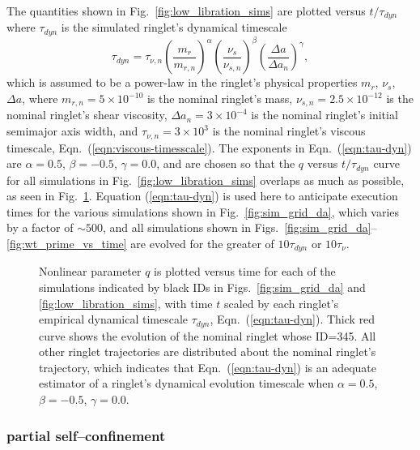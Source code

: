 \documentclass[preprint]{aastex62}
\begin{document}
The quantities shown in Fig.\ \ref{fig:low_libration_sims} are plotted versus 
$t/\tau_{dyn}$ where $\tau_{dyn}$ is the simulated ringlet's
dynamical timescale
\begin{equation}
    \label{eqn:tau-dyn}
    \tau_{dyn} = \tau_{\nu, n}\left(\frac{m_r}{m_{r,n}}\right)^\alpha
        \left(\frac{\nu_s}{\nu_{s,n}}\right)^\beta 
        \left(\frac{\Delta a}{\Delta a_{n}}\right)^\gamma,
\end{equation}
which is assumed to be a power-law in the ringlet's physical properties
$m_r$, $\nu_s$, $\Delta a$, where 
$m_{r,n}=5\times10^{-10}$ is the nominal ringlet's mass, 
$\nu_{s,n}=2.5\times10^{-12}$ is the nominal ringlet's shear viscosity, 
$\Delta a_{n}=3\times10^{-4}$ is the nominal ringlet's initial semimajor axis width,
and $\tau_{\nu, n} = 3\times10^3$ is the nominal ringlet's viscous timescale, 
Eqn.\ (\ref{eqn:viscous-timesscale}).
The exponents in Eqn.\ (\ref{eqn:tau-dyn}) are $\alpha=0.5$, $\beta=-0.5$, $\gamma=0.0$,
and are chosen so that the $q$ versus $t/\tau_{dyn}$ curve for all simulations
in Fig.\ \ref{fig:low_libration_sims} overlaps as much as possible, as
seen in Fig.\ \ref{fig:q_vs_ID}. Equation (\ref{eqn:tau-dyn}) is used here to anticipate
execution times for the various simulations shown in Fig.\ \ref{fig:sim_grid_da}, 
which varies by a factor of $\sim500$, and all simulations shown in 
Figs.\ \ref{fig:sim_grid_da}--\ref{fig:wt_prime_vs_time} are evolved for the greater of $10\tau_{dyn}$ or $10\tau_\nu$.
\begin{figure}
    \caption{
        \label{fig:q_vs_ID}
        Nonlinear parameter $q$ is plotted versus time for each of the
        simulations indicated by black IDs in Figs.\ \ref{fig:sim_grid_da} and \ref{fig:low_libration_sims},
        with time $t$ scaled by each ringlet's empirical dynamical timescale $\tau_{dyn}$,
        Eqn.\ (\ref{eqn:tau-dyn}). Thick red curve shows the evolution of the
        nominal ringlet whose ID=345. All other ringlet trajectories are distributed
        about the nominal ringlet's trajectory, which indicates that Eqn.\ (\ref{eqn:tau-dyn})
        is an adequate estimator of a ringlet's dynamical evolution timescale
        when $\alpha=0.5$, $\beta=-0.5$, $\gamma=0.0$.
    }
\end{figure}

\subsubsection{partial self--confinement}
\label{subsec:partial}
\end{document}
